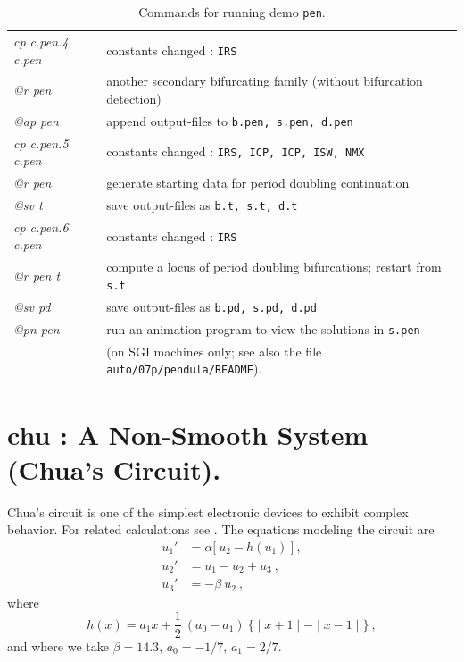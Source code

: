 \documentclass[12pt]{report}
\def\abs#1{\mid#1\mid}
\begin{document}
\begin{table}[htbp]
\begin{center}
\begin{tabular}{| l | l |}
\hline
  {\it cp c.pen.4 c.pen} & constants changed : {\tt IRS} \\ 
  {\it @r pen} &  another secondary bifurcating family (without bifurcation detection) \\ 
  {\it @ap pen} & append output-files to {\tt b.pen, s.pen, d.pen} \\ 
\hline
  {\it cp c.pen.5 c.pen} & constants changed : {\tt IRS, ICP, ICP, ISW, NMX} \\ 
  {\it @r pen} &  generate starting data for period doubling continuation \\ 
  {\it @sv t} & save output-files as {\tt b.t, s.t, d.t} \\ 
\hline
  {\it cp c.pen.6 c.pen} & constants changed : {\tt IRS} \\ 
  {\it @r pen t} &  compute a locus of period doubling bifurcations; restart from {\tt s.t} \\ 
  {\it @sv pd} & save output-files as {\tt b.pd, s.pd, d.pd} \\ 
\hline
  {\it @pn pen} & run an animation program to view the solutions in {\tt s.pen} \\ 
  & (on SGI machines only; see also the file {\tt auto/07p/pendula/README}).
  \\ 
\hline
\end{tabular}
\caption{Commands for running demo {\tt pen}.}
\label{tbl:demo_pen}
\end{center}
\end{table}

\newpage
\section{ chu :  A Non-Smooth System (Chua's Circuit).} \label{sec:Demos_chu}
Chua's circuit 
is one of the simplest electronic devices to exhibit complex behavior. 
For related calculations see
 \citeyear{KhRoCh:93}.
The equations modeling the circuit are
\begin{equation} \begin{array}{cl}
 u_1' &=  \alpha \bigl[~ u_2 - h(u_1) ~\bigr]~,\\ 
 u_2' &=  u_1 - u_2 + u_3~, \\  
 u_3' &=  - \beta~ u_2~,  
\end{array} \end{equation}
where
$$ h(x) = a_1 x + \frac{1}{2}~ (a_0 - a_1) ~
  \bigl\{ \abs{x+1} -  \abs{x-1} \bigr\}~,$$
and where we take
$\beta = 14.3$, $a_0 = - 1/7$, $a_1 = 2/7$.
\end{document}
